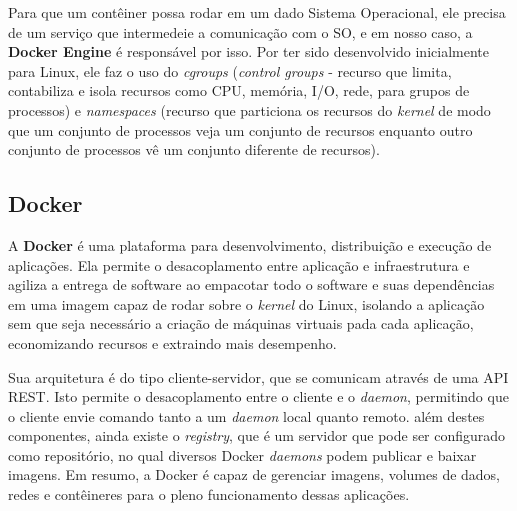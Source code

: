 \documentclass[12pt]{article}
\begin{document}
Para que um contêiner possa rodar em um dado Sistema Operacional, ele precisa de um serviço que intermedeie a comunicação com o SO, e em nosso caso, a \textbf{Docker Engine} é responsável por isso. Por ter sido desenvolvido inicialmente para Linux, ele faz o uso do \textit{cgroups} (\textit{control groups} - recurso que limita, contabiliza e isola recursos como CPU, memória, I/O, rede, para grupos de processos) e \textit{namespaces} (recurso que particiona os recursos do \textit{kernel} de modo que um conjunto de processos veja um conjunto de recursos enquanto outro conjunto de processos vê um conjunto diferente de recursos).

\subsection{Docker}
A \textbf{Docker} é uma plataforma para desenvolvimento, distribuição e execução de aplicações. Ela permite o desacoplamento entre aplicação e infraestrutura e agiliza a entrega de software ao empacotar todo o software e suas dependências em uma imagem capaz de rodar sobre o \textit{kernel} do Linux, isolando a aplicação sem que seja necessário a criação de máquinas virtuais pada cada aplicação, economizando recursos e extraindo mais desempenho.

Sua arquitetura é do tipo cliente-servidor, que se comunicam através de uma API REST. Isto permite o desacoplamento entre o cliente e o \textit{daemon}, permitindo que o cliente envie comando tanto a um \textit{daemon} local quanto remoto. além destes componentes, ainda existe o \textit{registry}, que é um servidor que pode ser configurado como repositório, no qual diversos Docker \textit{daemons} podem publicar e baixar imagens. Em resumo, a Docker é capaz de gerenciar imagens, volumes de dados, redes e contêineres para o pleno funcionamento dessas aplicações.

\end{document}
